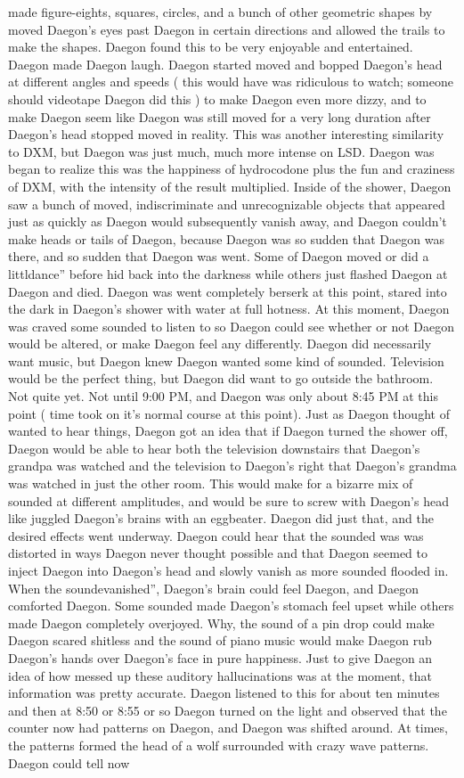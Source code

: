 \documentclass[12pt]{book}
\begin{document}
made figure-eights, squares, circles, and a bunch of other geometric shapes by moved Daegon's eyes past Daegon in certain directions and allowed the trails to make the shapes. Daegon found this to be very enjoyable and entertained. Daegon made Daegon laugh. Daegon started moved and bopped Daegon's head at different angles and speeds ( this would have was ridiculous to watch; someone should videotape Daegon did this ) to make Daegon even more dizzy, and to make Daegon seem like Daegon was still moved for a very long duration after Daegon's head stopped moved in reality. This was another interesting similarity to DXM, but Daegon was just much, much more intense on LSD. Daegon was began to realize this was the happiness of hydrocodone plus the fun and craziness of DXM, with the intensity of the result multiplied. Inside of the shower, Daegon saw a bunch of moved, indiscriminate and unrecognizable objects that appeared just as quickly as Daegon would subsequently vanish away, and Daegon couldn't make heads or tails of Daegon, because Daegon was so sudden that Daegon was there, and so sudden that Daegon was went. Some of Daegon moved or did a littldance'' before hid back into the darkness while others just flashed Daegon at Daegon and died. Daegon was went completely berserk at this point, stared into the dark in Daegon's shower with water at full hotness. At this moment, Daegon was craved some sounded to listen to so Daegon could see whether or not Daegon would be altered, or make Daegon feel any differently. Daegon did necessarily want music, but Daegon knew Daegon wanted some kind of sounded. Television would be the perfect thing, but Daegon did want to go outside the bathroom. Not quite yet. Not until 9:00 PM, and Daegon was only about 8:45 PM at this point ( time took on it's normal course at this point). Just as Daegon thought of wanted to hear things, Daegon got an idea that if Daegon turned the shower off, Daegon would be able to hear both the television downstairs that Daegon's grandpa was watched and the television to Daegon's right that Daegon's grandma was watched in just the other room. This would make for a bizarre mix of sounded at different amplitudes, and would be sure to screw with Daegon's head like juggled Daegon's brains with an eggbeater. Daegon did just that, and the desired effects went underway. Daegon could hear that the sounded was was distorted in ways Daegon never thought possible and that Daegon seemed to inject Daegon into Daegon's head and slowly vanish as more sounded flooded in. When the soundevanished'', Daegon's brain could feel Daegon, and Daegon comforted Daegon. Some sounded made Daegon's stomach feel upset while others made Daegon completely overjoyed. Why, the sound of a pin drop could make Daegon scared shitless and the sound of piano music would make Daegon rub Daegon's hands over Daegon's face in pure happiness. Just to give Daegon an idea of how messed up these auditory hallucinations was at the moment, that information was pretty accurate. Daegon listened to this for about ten minutes and then at 8:50 or 8:55 or so Daegon turned on the light and observed that the counter now had patterns on Daegon, and Daegon was shifted around. At times, the patterns formed the head of a wolf surrounded with crazy wave patterns. Daegon could tell now 
\end{document}
